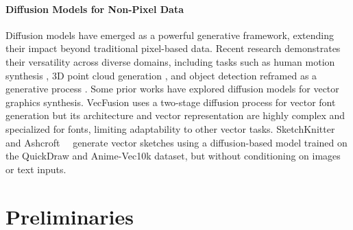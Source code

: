 \paragraph{\textbf{Diffusion Models for Non-Pixel Data}}
Diffusion models have emerged as a powerful generative framework, extending their impact beyond traditional pixel-based data. Recent research demonstrates their versatility across diverse domains, including tasks such as human motion synthesis \cite{tevet2023human}, 3D point cloud generation \cite{Luo2021DiffusionPM, Huang2025SPAR3DSP}, and object detection reframed as a generative process \cite{Chen2022DiffusionDetDM}.
Some prior works have explored diffusion models for vector graphics synthesis. 
VecFusion \cite{Thamizharasan_2024_CVPR} uses a two-stage diffusion process for vector font generation but its architecture and vector representation are highly complex and specialized for fonts, limiting adaptability to other vector tasks. SketchKnitter \cite{wang2023sketchknitter} and Ashcroft~\etal~\cite{ashcroft2024modelling} generate vector sketches using a diffusion-based model trained on the QuickDraw and Anime-Vec10k dataset, but without conditioning on images or text inputs.



















\section{Preliminaries}
\label{sec:preliminaries}

